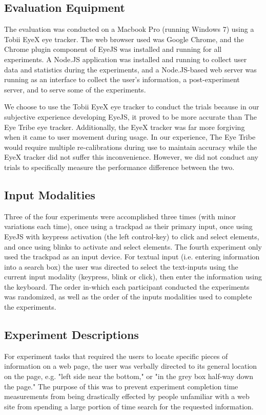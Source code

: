 \documentclass{sigchi}
\begin{document}
\subsection{Evaluation Equipment}
The evaluation was conducted on a Macbook Pro (running Windows 7) 
using a Tobii EyeX eye tracker. The web browser used was Google Chrome,
and the Chrome plugin component of EyeJS was installed and running for
all experiments. A Node.JS application was installed
and running to collect user data and statistics during the 
experiments, and a Node.JS-based web server was running as an interface
to collect the user's information, a post-experiment server, and to
serve some of the experiments.

We choose to use the Tobii EyeX eye tracker to conduct the trials
because in our subjective experience developing EyeJS, it proved to 
be more accurate than The Eye Tribe eye tracker. Additionally, the 
EyeX tracker was far more forgiving when it came to user movement
during usage. In our experience, The Eye Tribe would require multiple 
re-calibrations during use to maintain accuracy while the EyeX 
tracker did not suffer this inconvenience. However, we did 
not conduct any trials to specifically measure the performance 
difference between the two.

\subsection{Input Modalities}
Three of the four experiments were accomplished three times (with 
minor variations each time), once using a trackpad as their
primary input, once using EyeJS with keypress activation (the 
left control-key) to click and select elements, and once using 
blinks to activate and select elements. The fourth experiment 
only used the trackpad as an input device. For textual input (i.e. 
entering information into a search box) the user was directed to 
select the text-inputs using the current input modality (keypress, 
blink or click), then enter the information using the keyboard. 
The order in-which each participant conducted the experiments was 
randomized, as well as the order of the inputs modalities
used to complete the experiments.

\subsection{Experiment Descriptions}
For experiment tasks that required the users to locate specific pieces
of information on a web page, the user was verbally directed to its
general location on the page, e.g. "left side near the bottom," or
"in the grey box half-way down the page." The purpose of this was to
prevent experiment completion time measurements from being drastically
effected by people unfamiliar with a web site from spending a large 
portion of time search for the requested information.
\end{document}

